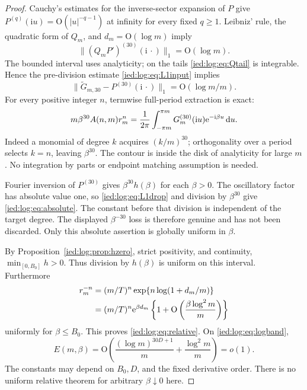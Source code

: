 \documentclass[11pt,letterpaper]{article}
\theoremstyle{remark}\newtheorem{remark}[theorem]{Remark}
\newcommand{\ii}{\mathrm i}\newcommand{\dd}{\,\mathrm d}
\newcommand{\Oh}{\mathrm O}\newcommand{\supp}{\operatorname{supp}}
\begin{document}
\begin{proof}
Cauchy's estimates for the inverse-sector expansion of $P$ give
$P^{(q)}(\ii u)=\Oh(|u|^{-q-1})$ at infinity for every fixed $q\ge1$.
Leibniz' rule, the quadratic form of $Q_m$, and $d_m=\Oh(\log m)$ imply
\[
 \|(Q_mP')^{(30)}(\ii\,\cdot)\|_1=\Oh(\log m).
\]
The bounded interval uses analyticity; on the tails \eqref{ied:log:eq:Qtail} is integrable. Hence the pre-division estimate \eqref{ied:log:eq:L1input} implies
\begin{equation}\label{ied:log:eq:L1drop}
 \|\widetilde G_{m,30}-P^{(30)}(\ii\,\cdot)\|_1
                       =\Oh(\log m/m).
\end{equation}
For every positive integer $n$, termwise full-period extraction is exact:
\begin{equation}\label{ied:log:eq:extract}
 m\beta^{30}A(n,m)r_m^n
 =\frac1{2\pi}\int_{-\pi m}^{\pi m}
 G_m^{(30)}(\ii u)\e^{-\ii\beta u}\dd u.
\end{equation}
Indeed a monomial of degree $k$ acquires $(k/m)^{30}$; orthogonality over a period selects $k=n$, leaving $\beta^{30}$. The contour is inside the disk of analyticity for large $m$. No integration by parts or endpoint matching assumption is needed.

Fourier inversion of $P^{(30)}$ gives $\beta^{30}h(\beta)$ for each $\beta>0$. The oscillatory factor has absolute value one, so \eqref{ied:log:eq:L1drop} and division by $\beta^{30}$ give \eqref{ied:log:eq:absolute}. The constant before that division is independent of the target degree. The displayed $\beta^{-30}$ loss is therefore genuine and has not been discarded. Only this absolute assertion is globally uniform in $\beta$.

By Proposition~\ref{ied:log:prop:hzero}, strict positivity, and continuity, $\min_{[0,B_0]}h>0$. Thus division by $h(\beta)$ is uniform on this interval. Furthermore
\begin{align*}
 r_m^{-n}&=(m/T)^n\exp\{n\log(1+d_m/m)\}\\
 &=(m/T)^n\e^{\beta d_m}
 \left\{1+\Oh\left(\frac{\beta\log^2m}{m}\right)\right\}
\end{align*}
uniformly for $\beta\le B_0$. This proves \eqref{ied:log:eq:relative}. On \eqref{ied:log:eq:logband},
\[
 E(m,\beta)=\Oh\left(\frac{(\log m)^{30D+1}}m
                      +\frac{\log^2m}{m}\right)=o(1).
\]
The constants may depend on $B_0,D$, and the fixed derivative order. There is no uniform relative theorem for arbitrary $\beta\downarrow0$ here.
\end{proof}
\end{document}
